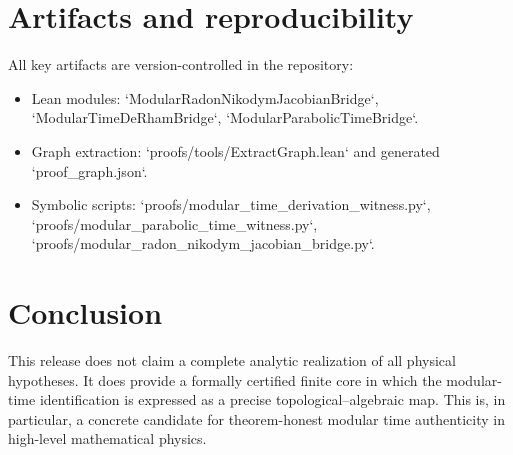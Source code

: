 \documentclass[11pt]{article}
\begin{document}
\section{Artifacts and reproducibility}
All key artifacts are version-controlled in the repository:
\begin{itemize}[leftmargin=*]
  \item Lean modules:
  `ModularRadonNikodymJacobianBridge`, `ModularTimeDeRhamBridge`,
  `ModularParabolicTimeBridge`.
  \item Graph extraction:
  `proofs/tools/ExtractGraph.lean` and generated `proof_graph.json`.
  \item Symbolic scripts:
  `proofs/modular_time_derivation_witness.py`,
  `proofs/modular_parabolic_time_witness.py`,
  `proofs/modular_radon_nikodym_jacobian_bridge.py`.
\end{itemize}

\section{Conclusion}
This release does not claim a complete analytic realization of all physical
hypotheses. It does provide a formally certified finite core in which the
modular-time identification is expressed as a precise topological--algebraic map.
This is, in particular, a concrete candidate for theorem-honest modular time
authenticity in high-level mathematical physics.
\end{document}
